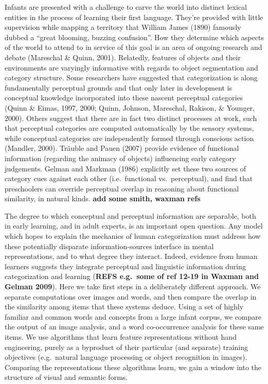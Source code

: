 \documentclass[10pt, letterpaper]{article}
\begin{document}
Infants are presented with a challenge to carve the world into distinct
lexical entities in the process of learning their first language.
They're provided with little supervision while mapping a territory that
William James (1890) famously dubbed a ``great blooming, buzzing
confusion''. How they determine which aspects of the world to attend to
in service of this goal is an area of ongoing research and debate
(Mareschal \& Quinn, 2001). Relatedly, features of objects and their
environments are varyingly informative with regards to object
segmentation and category structure. Some researchers have suggested
that categorization is along fundamentally perceptual grounds and that
only later in development is conceptual knowledge incorporated into
these nascent perceptual categories (Quinn \& Eimas, 1997, 2000; Quinn,
Johnson, Mareschal, Rakison, \& Younger, 2000). Others suggest that
there are in fact two distinct processes at work, such that perceptual
categories are computed automatically by the sensory systems, while
conceptual categories are independently formed through conscious action
(Mandler, 2000). Träuble and Pauen (2007) provide evidence of functional
information (regarding the animacy of objects) influencing early
category judgements. Gelman and Markman (1986) explicitly set these two
sources of category cues against each other (i.e.~functional
vs.~perceptual), and find that preschoolers can override perceptual
overlap in reasoning about functional similarity, in natural kinds.
\textbf{add some smith, waxman refs}

The degree to which conceptual and perceptual information are separable,
both in early learning, and in adult experts, is an important open
question. Any model which hopes to explain the mechanics of human
categorization must address how these potentially disparate
information-sources interface in mental representations, and to what
degree they interact. Indeed, evidence from human learners suggests they
integrate perceptual and linguistic information during categorization
and learning (\textbf{REFS e.g.~some of ref 12-19 in Waxman and Gelman
2009}). Here we take first steps in a deliberately different approach.
We separate computations over images and words, and then compare the
overlap in the similarity among items that these systems deduce. Using a
set of highly familiar and common words and concepts from a large infant
corpus, we compare the output of an image analysis, and a word
co-occurrence analysis for these same items. We use algorithms that
learn feature representations without hand engineering, purely as a
byproduct of their particular (and separate) training objectives
(e.g.~natural language processing or object recognition in images).
Comparing the representations these algorithms learn, we gain a window
into the structure of visual and semantic forms.
\end{document}
